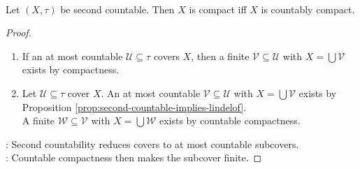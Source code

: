 \begin{proposition} \label{prop:second-countable-countably-compact-compact} \\
Let $(X,\tau)$ be second countable. Then $X$ is compact iff $X$ is countably compact.
\begin{proof}
\begin{enumerate}[label=\roman*.]
\setlength{\itemsep}{0pt}
\item[$(\Rightarrow)$] If an at most countable $\mathcal{U}\subseteq\tau$ covers $X$, then a finite $\mathcal{V}\subseteq\mathcal{U}$ with $X=\bigcup\mathcal{V}$ exists by compactness.
\item[$(\Leftarrow)$] Let $\mathcal{U}\subseteq\tau$ cover $X$. An at most countable $\mathcal{V}\subseteq\mathcal{U}$ with $X=\bigcup\mathcal{V}$ exists by Proposition \ref{prop:second-countable-implies-lindelof}.\\
A finite $\mathcal{W}\subseteq\mathcal{V}$ with $X=\bigcup\mathcal{W}$ exists by countable compactness.
\end{enumerate}
: Second countability reduces covers to at most countable subcovers.\\
: Countable compactness then makes the subcover finite.
\end{proof}
\end{proposition}

